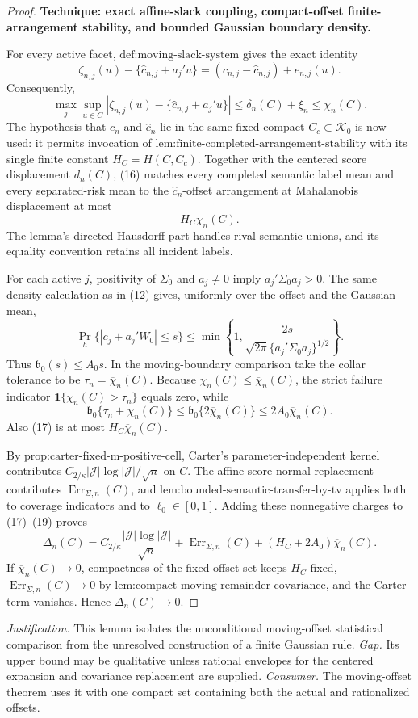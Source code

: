 \documentclass{article}
\begin{document}
\begin{proof}
\textbf{Technique: exact affine-slack coupling, compact-offset finite-arrangement stability, and bounded Gaussian boundary density.}

For every active facet, \(\text{def:moving-slack-system}\) gives the exact identity
\[
\zeta_{n,j}(u)-\{\widehat c_{n,j}+a_j'u\}
=(c_{n,j}-\widehat c_{n,j})+e_{n,j}(u).
\tag{15}
\]
Consequently,
\[
\max_j\sup_{u\in C}
\left|\zeta_{n,j}(u)-\{\widehat c_{n,j}+a_j'u\}\right|
\le\delta_n(C)+\xi_n\le\chi_n(C).
\tag{16}
\]
The hypothesis that \(c_n\) and \(\widehat c_n\) lie in the same fixed compact \(C_c\subset\mathcal K_0\) is now used: it permits invocation of \(\text{lem:finite-completed-arrangement-stability}\) with its single finite constant
\(H_C=H(C,C_c)\).  Together with the centered score displacement \(d_n(C)\), (16) matches every completed semantic label mean and every separated-risk mean to the \(\widehat c_n\)-offset arrangement at Mahalanobis displacement at most
\[
H_C\chi_n(C).
\tag{17}
\]
The lemma's directed Hausdorff part handles rival semantic unions, and its equality convention retains all incident labels.

For each active \(j\), positivity of \(\Sigma_0\) and \(a_j\ne0\) imply \(a_j'\Sigma_0a_j>0\).  The same density calculation as in (12) gives, uniformly over the offset and the Gaussian mean,
\[
\Pr_h\{|c_j+a_j'W_0|\le s\}
\le\min\left\{1,
\frac{2s}{\sqrt{2\pi}\{a_j'\Sigma_0a_j\}^{1/2}}\right\}.
\tag{18}
\]
Thus \(\mathfrak b_0(s)\le A_0s\).  In the moving-boundary comparison take the collar tolerance to be
\(\tau_n=\overline\chi_n(C)\).  Because
\(\chi_n(C)\le\overline\chi_n(C)\), the strict failure indicator
\(\mathbf1\{\chi_n(C)>\tau_n\}\) equals zero, while
\[
\mathfrak b_0\{\tau_n+\chi_n(C)\}
\le\mathfrak b_0\{2\overline\chi_n(C)\}
\le2A_0\overline\chi_n(C).
\tag{19}
\]
Also (17) is at most \(H_C\overline\chi_n(C)\).

By \(\text{prop:carter-fixed-m-positive-cell}\), Carter's parameter-independent kernel contributes
\(C_{2/\kappa}|\mathcal J|\log|\mathcal J|/\sqrt n\) on \(C\).  The affine score-normal replacement contributes \(\operatorname{Err}_{\Sigma,n}(C)\), and \(\text{lem:bounded-semantic-transfer-by-tv}\) applies both to coverage indicators and to \(\ell_0\in[0,1]\).  Adding these nonnegative charges to (17)--(19) proves
\[
\Delta_n(C)
=C_{2/\kappa}\frac{|\mathcal J|\log|\mathcal J|}{\sqrt n}
+\operatorname{Err}_{\Sigma,n}(C)
+(H_C+2A_0)\overline\chi_n(C).
\tag{20}
\]
If \(\overline\chi_n(C)\to0\), compactness of the fixed offset set keeps \(H_C\) fixed, \(\operatorname{Err}_{\Sigma,n}(C)\to0\) by \(\text{lem:compact-moving-remainder-covariance}\), and the Carter term vanishes.  Hence \(\Delta_n(C)\to0\).
\end{proof}
\par\smallskip\noindent \textit{Justification.} This lemma isolates the unconditional moving-offset statistical comparison from the unresolved construction of a finite Gaussian rule. \textit{Gap.} Its upper bound may be qualitative unless rational envelopes for the centered expansion and covariance replacement are supplied. \textit{Consumer.} The moving-offset theorem uses it with one compact set containing both the actual and rationalized offsets.
\end{document}

